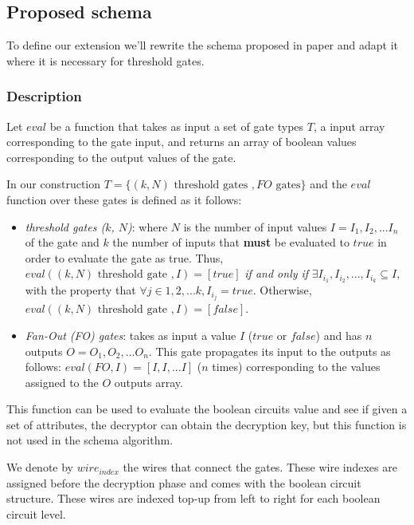 \documentclass[12pt]{article}
\begin{document}
\subsection{Proposed schema}

To define our extension we'll rewrite the schema proposed in \cite{fltccd} paper and adapt it where it is necessary for threshold gates.

\subsubsection{Description}

Let $eval$ be a function that takes as input a set of gate types $T$, a input array corresponding to the gate input, and returns an array of boolean values corresponding to the output values of the gate.

In our construction $T = \{(k, N) \textrm{ threshold gates }, FO \textrm{ gates}\}$ and the $eval$ function over these gates is defined as it follows:

\begin{itemize}
 	\item \textit{threshold gates ($k$, $N$)}: where $N$ is the number of input values $I = I_1, I_2, ...I_n$ of the gate and $k$ the number of inputs that \textbf{must} be evaluated to $true$ in order to evaluate the gate as true. Thus, $eval((k, N) \textrm{ threshold gate }, I) = [true]$ \textit{if and only if} $\exists I_{i_1}, I_{i_2}, ..., I_{i_k} \subseteq I, $ with the property that $\forall j \in {1, 2, ...k}, I_{i_j} = true$. Otherwise, $eval((k, N) \textrm{ threshold gate }, I) = [false]$.

 	\item \textit{Fan-Out (FO) gates}: takes as input a value $I$ ($true$ or $false$) and has $n$ outputs $O = O_1, O_2, ... O_n$. This gate propagates its input to the outputs as follows: $eval(FO, I) = [I, I, ...I]$ ($n$ times) corresponding to the values assigned to the $O$ outputs array.
\end{itemize}

This function can be used to evaluate the boolean circuits value and see if given a set of attributes, the decryptor can obtain the decryption key, but this function is not used in the schema algorithm.

We denote by $wire_{index}$ the wires that connect the gates. These wire indexes are assigned before the decryption phase and comes with the boolean circuit structure. These wires are indexed top-up from left to right for each boolean circuit level.
\end{document}

